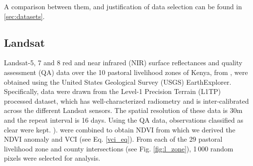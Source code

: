 \documentclass[review]{elsarticle}
\begin{document}
 A comparison between them, and justification of data selection can be found in \ref{sec:datasets}.

\subsection{Landsat}
Landsat-5, 7 and 8 \citep{royetal} red and near infrared (NIR) surface reflectances and quality assessment (QA) data over the 10 pastoral livelihood zones of Kenya, from , were obtained using the United States Geological Survey (USGS) EarthExplorer. Specifically, data were drawn from the Level-1 Precision Terrain (L1TP) processed dataset, which has well-characterized radiometry and is inter-calibrated across the different Landsat sensors. The spatial resolution of these data is 30m and the repeat interval is 16 days. Using the QA data, observations classified as clear were kept. ). %
 were combined to obtain NDVI %
from which we derived the NDVI anomaly and VCI {\color{blue}(see Eq. \ref{vci_eq})}. From each of the 29 pastoral livelihood zone and county intersections (see Fig. \ref{fig:l_zone}), 1\,000 random pixels were selected for analysis.
\end{document}
